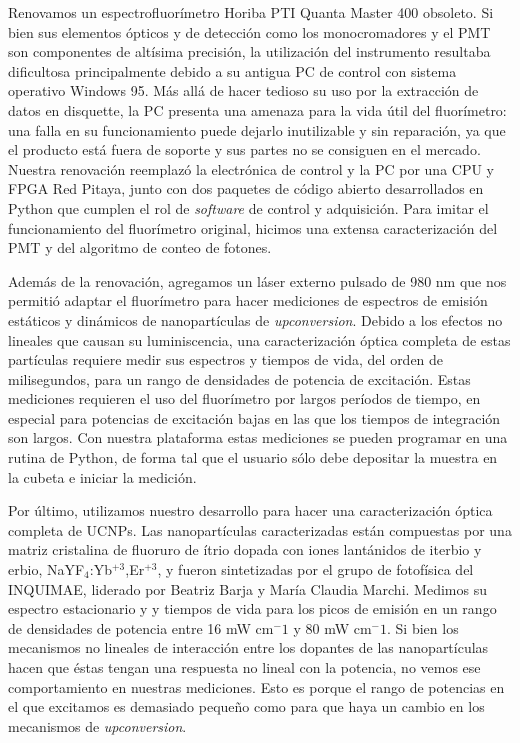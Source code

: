 \renewcommand{\tablename}{\textbf{Tabla}}

Renovamos un espectrofluorímetro Horiba PTI Quanta Master 400 obsoleto.
Si bien sus elementos ópticos y de detección como los monocromadores y el PMT son componentes de altísima precisión, la utilización del instrumento resultaba dificultosa principalmente debido a su antigua PC de control con sistema operativo Windows 95.
Más allá de hacer tedioso su uso por la extracción de datos en disquette, la PC presenta una amenaza para la vida útil del fluorímetro: una falla en su funcionamiento puede dejarlo inutilizable y sin reparación, ya que el producto está fuera de soporte y sus partes no se consiguen en el mercado.
Nuestra renovación reemplazó la electrónica de control y la PC por una CPU y FPGA Red Pitaya, junto con dos paquetes de código abierto desarrollados en Python que cumplen el rol de \textit{software} de control y adquisición.
Para imitar el funcionamiento del fluorímetro original, hicimos una extensa caracterización del PMT y del algoritmo de conteo de fotones.

Además de la renovación, agregamos un láser externo pulsado de 980 nm que nos permitió adaptar el fluorímetro para hacer mediciones de espectros de emisión estáticos y dinámicos de nanopartículas de \textit{upconversion}.
Debido a los efectos no lineales que causan su luminiscencia, una caracterización óptica completa de estas partículas requiere medir sus espectros y tiempos de vida, del orden de milisegundos, para un rango de densidades de potencia de excitación.
Estas mediciones requieren el uso del fluorímetro por largos períodos de tiempo, en especial para potencias de excitación bajas en las que los tiempos de integración son largos.
Con nuestra plataforma estas mediciones se pueden programar en una rutina de Python, de forma tal que el usuario sólo debe depositar la muestra en la cubeta e iniciar la medición.

Por último, utilizamos nuestro desarrollo para hacer una caracterización óptica completa de UCNPs.
Las nanopartículas caracterizadas están compuestas por una matriz cristalina de fluoruro de ítrio dopada con iones lantánidos de iterbio y erbio, NaYF$_4$:Yb$^{+3}$,Er$^{+3}$, y fueron sintetizadas por el grupo de fotofísica del INQUIMAE, liderado por Beatriz Barja y María Claudia Marchi. 
Medimos su espectro estacionario y y tiempos de vida para los picos de emisión en un rango de densidades de potencia entre 16 mW cm$^-1$ y 80 mW cm$^-1$.
Si bien los mecanismos no lineales de interacción entre los dopantes de las nanopartículas hacen que éstas tengan una respuesta no lineal con la potencia, no vemos ese comportamiento en nuestras mediciones.
Esto es porque el rango de potencias en el que excitamos es demasiado pequeño como para que haya un cambio en los mecanismos de \textit{upconversion}.

